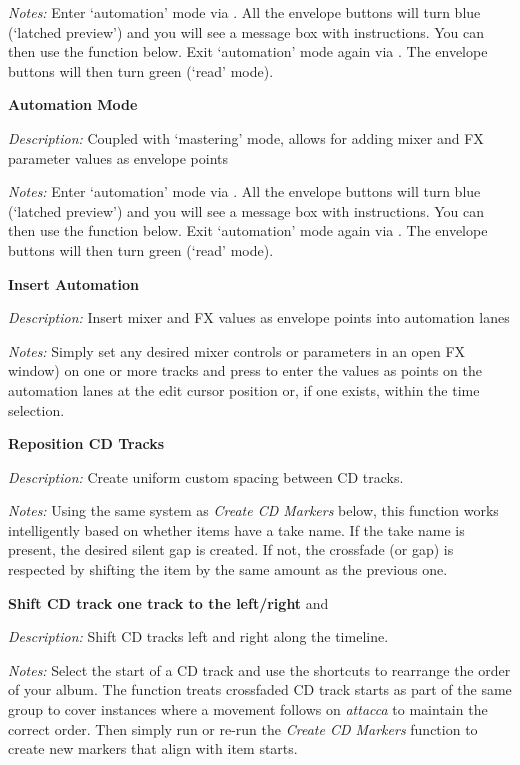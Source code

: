 \documentclass[10pt,american]{article}
\begin{document}
\emph{Notes: }Enter `automation' mode via . All the envelope
buttons will turn blue (`latched preview') and you will see a message box with
instructions. You can then use the function below. Exit `automation' mode again
via . The envelope buttons will then turn green (`read' mode).

\textbf{Automation Mode }

\emph{Description: }Coupled with `mastering' mode, allows for adding mixer and
FX parameter values as envelope points

\emph{Notes: }Enter `automation' mode via . All the envelope
buttons will turn blue (`latched preview') and you will see a message box with
instructions. You can then use the function below. Exit `automation' mode again
via . The envelope buttons will then turn green (`read' mode).

\textbf{Insert Automation }

\emph{Description: }Insert mixer and FX values as envelope points into
automation lanes

\emph{Notes: }Simply set any desired mixer controls or parameters in an open FX
window) on one or more tracks and press  to enter the values as points
on the automation lanes at the edit cursor position or, if one exists, within
the time selection.

\textbf{Reposition CD Tracks }

\emph{Description: }Create uniform custom spacing between CD tracks.

\emph{Notes: }Using the same system as \emph{Create CD Markers} below, this
function works intelligently based on whether items have a take name. If the
take name is present, the desired silent gap is created. If not, the crossfade
(or gap) is respected by shifting the item by the same amount as the previous
one.

\textbf{Shift CD track one track to the left/right }\keys{\ctrl+\arrowkeyleft}
and \keys{\ctrl+\arrowkeyright}

\emph{Description: }Shift CD tracks left and right along the timeline.

\emph{Notes: }Select the start of a CD track and use the shortcuts to rearrange
the order of your album. The function treats crossfaded CD track starts as part
of the same group to cover instances where a movement follows on \emph{attacca
}to maintain the correct order. Then simply run or re-run the \emph{Create CD
Markers} function to create new markers that align with item starts.
\end{document}

